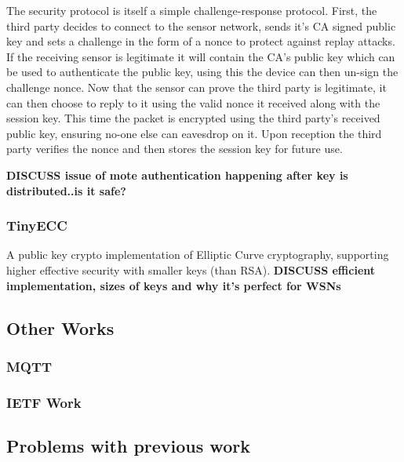 \documentclass{mprop}
\begin{document}
The security protocol is itself a simple challenge-response protocol. First, the third party decides to connect to the sensor network, sends it's CA signed public key and sets a challenge in the form of a nonce to protect against replay attacks. If the receiving sensor is legitimate it will contain the CA's public key which can be used to authenticate the public key, using this the device can then un-sign the challenge nonce. Now that the sensor can prove the third party is legitimate, it can then choose to reply to it using the valid nonce it received along with the session key. This time the packet is encrypted using the third party's received public key, ensuring no-one else can eavesdrop on it. Upon reception the third party verifies the nonce and then stores the session key for future use. 

\textbf{DISCUSS issue of mote authentication happening after key is distributed..is it safe?}
\subsubsection{TinyECC} %
\label{ssub:tinyecc}
\cite{TinyECC}
A public key crypto implementation of Elliptic Curve cryptography, supporting higher effective security with smaller keys (than RSA).
\textbf{DISCUSS efficient implementation, sizes of keys and why it's perfect for WSNs}



\subsection{Other Works} %
\label{sub:other_works}
\subsubsection{MQTT} %
\label{ssub:mqtt}

\subsubsection{IETF Work} %
\label{ssub:ietf_work}
\cite{IETF_COAP_HTTP, IETF_CORE}

\subsection{Problems with previous work} %
\label{sub:problems_with_previous_work}
\end{document}
